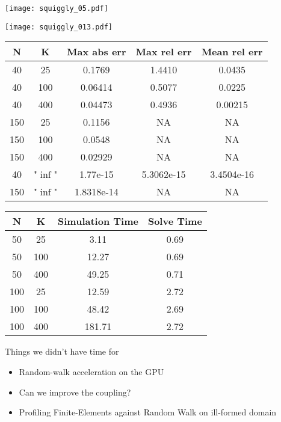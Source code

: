 \documentclass{beamer}
\begin{document}

\begin{frame}
	\begin{centering}
	\texttt{[image: squiggly\_05.pdf]}
	\end{centering}
\end{frame}
\begin{frame}
	\begin{centering}
	\texttt{[image: squiggly\_013.pdf]}
	\end{centering}
\end{frame}

\begin{frame}
\begin{center}
	\begin{tabular}{|c|c|c|c|c|}
		\hline
		N & K & Max abs err & Max rel err & Mean rel err \\  
		\hline 
		40 & 25 & 0.1769 & 1.4410 & 0.0435 \\
		40 & 100 & 0.06414 & 0.5077 & 0.0225 \\
		40 & 400 & 0.04473 & 0.4936 & 0.00215 \\
		150 & 25 & 0.1156 & NA & NA \\
		150 & 100 & 0.0548 & NA & NA \\
		150 & 400 & 0.02929 & NA & NA \\
		40 & "$\inf$" & 1.77e-15 & 5.3062e-15 & 3.4504e-16 \\ 
		150 & "$\inf$" & 1.8318e-14 & NA & NA \\
		\hline
	\end{tabular}
	\end{center}
\end{frame}


\begin{frame}
	\begin{centering}
		\begin{tabular}{|c|c|c|c|}
			\hline
			N&K&Simulation Time&Solve Time\\
			\hline
			50&25&3.11&0.69\\
			50&100&12.27&0.69\\
			50&400&49.25&0.71\\
			100&25&12.59&2.72\\
			100&100&48.42&2.69\\
			100&400&181.71&2.72\\
			\hline
			\end{tabular}
	\end{centering}
	
\end{frame}

\begin{frame}{Things we didn't have time for}
	\begin{itemize}
		\item Random-walk acceleration on the GPU
		\item Can we improve the coupling?
		\item Profiling Finite-Elements against Random Walk on ill-formed domain
	\end{itemize}
\end{frame}

\end{document}
